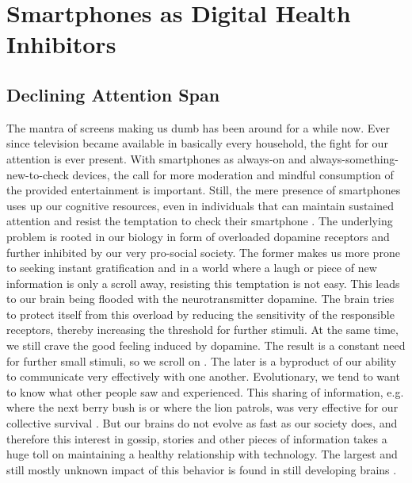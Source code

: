 \section{Smartphones as Digital Health Inhibitors}
\label{sec:smartphoneIssues}
\subsection{Declining Attention Span}
The mantra of screens making us dumb has been around for a while now. Ever since television became available in basically every household, the fight for our attention is ever present. With smartphones as always-on and always-something-new-to-check devices, the call for more moderation and mindful consumption of the provided entertainment is important. Still, the mere presence of smartphones uses up our cognitive resources, even in individuals that can maintain sustained attention and resist the temptation to check their smartphone \cite{ward2017brain}. The underlying problem is rooted in our biology in form of overloaded dopamine receptors and further inhibited by our very pro-social society. The former makes us more prone to seeking instant gratification and in a world where a laugh or piece of new information is only a scroll away, resisting this temptation is not easy. This leads to our brain being flooded with the neurotransmitter dopamine. The brain tries to protect itself from this overload by reducing the sensitivity of the responsible receptors, thereby increasing the threshold for further stimuli. At the same time, we still crave the good feeling induced by dopamine. The result is a constant need for further small stimuli, so we scroll on \cite{nieoullon2002dopamine,dopamineRole}. The later is a byproduct of our ability to communicate very effectively with one another. Evolutionary, we tend to want to know what other people saw and experienced. This sharing of information, e.g. where the next berry bush is or where the lion patrols, was very effective for our collective survival \cite{sapiens}. But our brains do not evolve as fast as our society does, and therefore this interest in gossip, stories and other pieces of information takes a huge toll on maintaining a healthy relationship with technology. The largest and still mostly unknown impact of this behavior is found in still developing brains \cite{crone2018media}.
